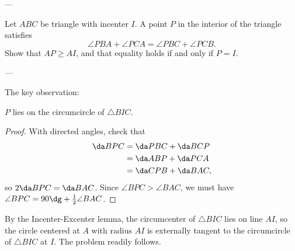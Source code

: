 
---

Let $ABC$ be triangle with incenter $I$. A point $P$ in the interior of the triangle satisfies \[\angle PBA+\angle PCA=\angle PBC+\angle PCB.\]
Show that $AP\ge AI$, and that equality holds if and only if $P=I$.

---

The key observation:
\begin{claim*}
    $P$ lies on the circumcircle of $\triangle BIC$.
\end{claim*}
\begin{proof}
    With directed angles, check that
    \begin{align*}
        \da BPC&=\da PBC+\da BCP\\
        &=\da ABP+\da PCA\\
        &=\da CPB+\da BAC,
    \end{align*}
    so $2\da BPC=\da BAC$. Since $\angle BPC>\angle BAC$, we must have $\angle BPC=90\dg+\frac12\angle BAC$.
\end{proof}

By the Incenter-Excenter lemma, the circumcenter of $\triangle BIC$ lies on line $AI$, so the circle centered at $A$ with radius $AI$ is externally tangent to the circumcircle of $\triangle BIC$ at $I$. The problem readily follows.

